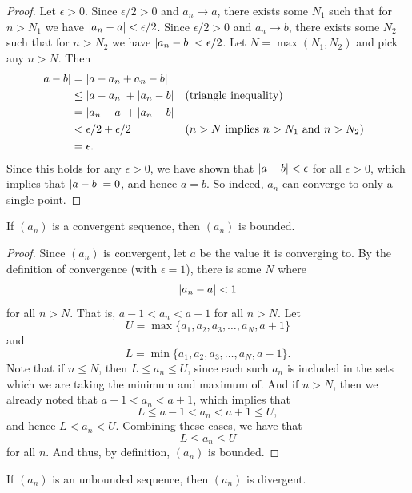 \documentclass[11pt,twoside=off,numbers=noenddot]{scrbook}
\begin{document}
\begin{proof}
  Let $\epsilon > 0$. Since $\epsilon/2 > 0$ and $a_n \to a$,
  there exists some $N_1$ such that for $n > N_1$ we have $| a_n -
  a | < \epsilon/2$. Since $\epsilon/2 > 0$ and $a_n \to b$,
  there exists some $N_2$ such that for $n > N_2$ we have $| a_n -
  b | < \epsilon/2$. Let $N = \max(N_1, N_2)$ and pick any $n > N$. Then
  \begin{align*}
    | a - b | &= | a - a_n + a_n - b | \\
    &\leq | a - a_n | + | a_n - b | && \text{(triangle inequality)} \\
    &= | a_n - a | + | a_n - b | \\
    &< \epsilon/2 + \epsilon/2 && \text{($n > N$ implies $n >
    N_1$ and $n > N_2$)} \\
    &= \epsilon.
  \end{align*}
  Since this holds for any $\epsilon > 0$, we have shown that
  $| a - b | < \epsilon$ for all $\epsilon > 0$, which
  implies that $| a - b | = 0$, and hence $a = b$. So indeed, $a_n$
  can converge to only a single point.
\end{proof}

\begin{proposition}
  If $(a_n)$ is a convergent sequence, then $(a_n)$ is bounded.
\end{proposition}

\begin{proof}
  Since $(a_n)$ is convergent, let $a$ be the value it is converging
  to. By the definition of convergence (with $\epsilon = 1$), there
  is some $N$ where
  \[ | a_n - a | < 1 \]
  for all $n > N$. That is, $a - 1 < a_n < a + 1$ for all $n > N$. Let
  \[ U = \max \{a_1, a_2, a_3, \dots, a_N, a + 1\} \]
  and
  \[ L = \min \{a_1, a_2, a_3, \dots, a_N, a - 1\}. \]
  Note that if $n \leq N$, then $L \leq a_n \leq U$, since each such
  $a_n$ is included in the sets which we are taking the minimum and
  maximum of. And if $n > N$, then we already noted that $a - 1 < a_n
  < a + 1$, which implies that
  \[ L \leq a - 1 < a_n < a + 1 \leq U, \]
  and hence $L < a_n < U$. Combining these cases, we have that
  \[ L \leq a_n \leq U \]
  for all $n$. And thus, by definition, $(a_n)$ is bounded.
\end{proof}

\begin{corollary}
  If $(a_n)$ is an unbounded sequence, then $(a_n)$ is divergent.
\end{corollary}
\end{document}
